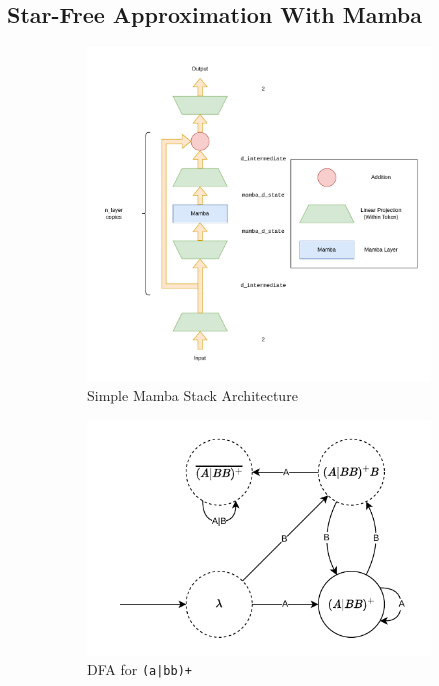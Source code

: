 \subsection{Star-Free Approximation With Mamba}
\begin{figure}
    
\begin{subfigure}{0.5\textwidth}
    \includegraphics[width=\textwidth]{figures/sequence_stack_simple.pdf}
    \caption{Simple Mamba Stack Architecture}
    \label{simplestack}
\end{subfigure}\begin{subfigure}{0.5\textwidth}
    \includegraphics[width=\textwidth]{figures/a_or_bb_plus_dfa.pdf}
    \caption{DFA for \texttt{(a|bb)+}}
    \label{a_or_bb_plus_dfa}
\end{subfigure}
    \caption{}
\end{figure}

